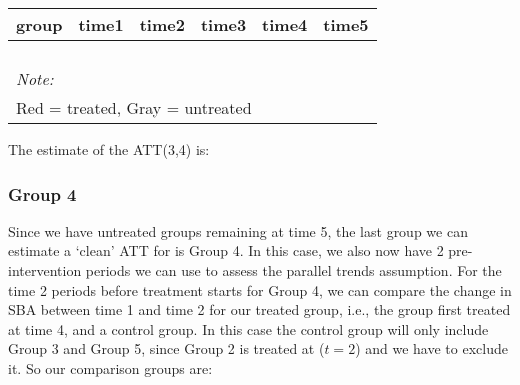 \documentclass[
]{article}
\begin{document}
\begin{table}
\centering
\begin{tabular}[t]{>{}r|>{}r|>{}r|>{}r|>{}r|>{}r}
\hline
group & time1 & time2 & time3 & time4 & time5\\
\hline
\cellcolor{white}{2} & \cellcolor{white}{0.631} & \cellcolor{white}{\textcolor{black}{0.711}} & \cellcolor{white}{0.814} & \cellcolor{white}{\textcolor{black}{0.846}} & \cellcolor{white}{0.826}\\
\hline
\cellcolor{white}{3} & \cellcolor{white}{0.678} & \cellcolor{red}{\textcolor{black}{0.770}} & \cellcolor{white}{0.664} & \cellcolor{red}{\textcolor{black}{0.800}} & \cellcolor{white}{0.784}\\
\hline
\cellcolor{white}{4} & \cellcolor{white}{0.778} & \cellcolor{white}{\textcolor{black}{0.807}} & \cellcolor{white}{0.673} & \cellcolor{white}{\textcolor{black}{0.750}} & \cellcolor{white}{0.868}\\
\hline
\cellcolor{white}{5} & \cellcolor{white}{0.854} & \cellcolor{lightgray}{\textcolor{black}{0.939}} & \cellcolor{white}{0.854} & \cellcolor{lightgray}{\textcolor{black}{0.800}} & \cellcolor{white}{0.855}\\
\hline
\multicolumn{6}{l}{\rule{0pt}{1em}\textit{Note: }}\\
\multicolumn{6}{l}{\rule{0pt}{1em}Red = treated, Gray = untreated}\\
\end{tabular}
\end{table}

The estimate of the ATT(3,4) is:

\hypertarget{group-4}{%
\subsubsection{Group 4}\label{group-4}}

Since we have untreated groups remaining at time 5, the last group we
can estimate a `clean' ATT for is Group 4. In this case, we also now
have 2 pre-intervention periods we can use to assess the parallel trends
assumption. For the time 2 periods before treatment starts for Group 4,
we can compare the change in SBA between time 1 and time 2 for our
treated group, i.e., the group first treated at time 4, and a control
group. In this case the control group will only include Group 3 and
Group 5, since Group 2 is treated at (\(t=2\)) and we have to exclude
it. So our comparison groups are:
\end{document}

